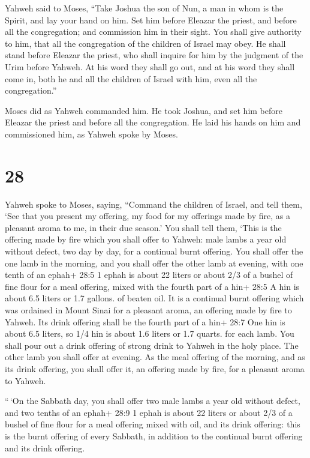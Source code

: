  Yahweh said to Moses, ``Take Joshua the son of Nun, a man
in whom is the Spirit, and lay your hand on him.  Set him
before Eleazar the priest, and before all the congregation; and
commission him in their sight.  You shall give authority to
him, that all the congregation of the children of Israel may obey.
 He shall stand before Eleazar the priest, who shall
inquire for him by the judgment of the Urim before Yahweh. At his word
they shall go out, and at his word they shall come in, both he and all
the children of Israel with him, even all the congregation.''

 Moses did as Yahweh commanded him. He took Joshua, and set
him before Eleazar the priest and before all the congregation.
 He laid his hands on him and commissioned him, as Yahweh
spoke by Moses.

\hypertarget{section-27}{%
\section{28}\label{section-27}}

 Yahweh spoke to Moses, saying,  ``Command the
children of Israel, and tell them, `See that you present my offering, my
food for my offerings made by fire, as a pleasant aroma to me, in their
due season.'  You shall tell them, `This is the offering
made by fire which you shall offer to Yahweh: male lambs a year old
without defect, two day by day, for a continual burnt offering.
 You shall offer the one lamb in the morning, and you shall
offer the other lamb at evening,  with one tenth of an
ephah+ 28:5 1 ephah is about 22 liters or about 2/3 of a bushel of fine
flour for a meal offering, mixed with the fourth part of a hin+ 28:5 A
hin is about 6.5 liters or 1.7 gallons. of beaten oil.  It
is a continual burnt offering which was ordained in Mount Sinai for a
pleasant aroma, an offering made by fire to Yahweh.  Its
drink offering shall be the fourth part of a hin+ 28:7 One hin is about
6.5 liters, so 1/4 hin is about 1.6 liters or 1.7 quarts. for each lamb.
You shall pour out a drink offering of strong drink to Yahweh in the
holy place.  The other lamb you shall offer at evening. As
the meal offering of the morning, and as its drink offering, you shall
offer it, an offering made by fire, for a pleasant aroma to Yahweh.

 ``\,`On the Sabbath day, you shall offer two male lambs a
year old without defect, and two tenths of an ephah+ 28:9 1 ephah is
about 22 liters or about 2/3 of a bushel of fine flour for a meal
offering mixed with oil, and its drink offering:  this is
the burnt offering of every Sabbath, in addition to the continual burnt
offering and its drink offering.

